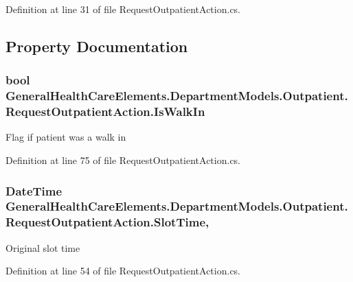 Definition at line 31 of file Request\+Outpatient\+Action.\+cs.



\subsection{Property Documentation}
\subsubsection[{\texorpdfstring{Is\+Walk\+In}{IsWalkIn}}]{\setlength{\rightskip}{0pt plus 5cm}bool General\+Health\+Care\+Elements.\+Department\+Models.\+Outpatient.\+Request\+Outpatient\+Action.\+Is\+Walk\+In\hspace{0.3cm}{\ttfamily [get]}}\hypertarget{class_general_health_care_elements_1_1_department_models_1_1_outpatient_1_1_request_outpatient_action_ac80128e67ed9665a901e2129c43a7201}{}\label{class_general_health_care_elements_1_1_department_models_1_1_outpatient_1_1_request_outpatient_action_ac80128e67ed9665a901e2129c43a7201}


Flag if patient was a walk in 



Definition at line 75 of file Request\+Outpatient\+Action.\+cs.

\subsubsection[{\texorpdfstring{Slot\+Time}{SlotTime}}]{\setlength{\rightskip}{0pt plus 5cm}Date\+Time General\+Health\+Care\+Elements.\+Department\+Models.\+Outpatient.\+Request\+Outpatient\+Action.\+Slot\+Time\hspace{0.3cm}{\ttfamily [get]}, {\ttfamily [set]}}\hypertarget{class_general_health_care_elements_1_1_department_models_1_1_outpatient_1_1_request_outpatient_action_ac1ae13fe62c6b2285ca42ae099f85a57}{}\label{class_general_health_care_elements_1_1_department_models_1_1_outpatient_1_1_request_outpatient_action_ac1ae13fe62c6b2285ca42ae099f85a57}


Original slot time 



Definition at line 54 of file Request\+Outpatient\+Action.\+cs.

